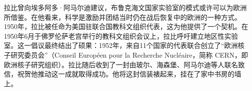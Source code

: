 拉比曾向埃多阿多·阿马尔迪建议，布鲁克海文国家实验室的模式或许可以为欧洲所借鉴。在他看来，科学是激励并团结当时仍在战后恢复中的欧洲的一种方式。1950年，拉比被任命为美国驻联合国教科文组织代表，这为他提供了一个契机。在1950年6月于佛罗伦萨老宫举行的教科文组织会议上，拉比呼吁建立地区性实验室。这一倡议最终结出了硕果：1952年，来自11个国家的代表联合创立了“欧洲核子研究委员会”（Conseil Européen pour la Recherche Nucléaire，简称 CERN，即欧洲核子研究组织）。拉比随后收到了一封由玻尔、海森堡、阿马尔迪等人联名致信，祝贺他推动这一成就取得成功。他将这封信装裱起来，挂在了家中书房的墙上。
